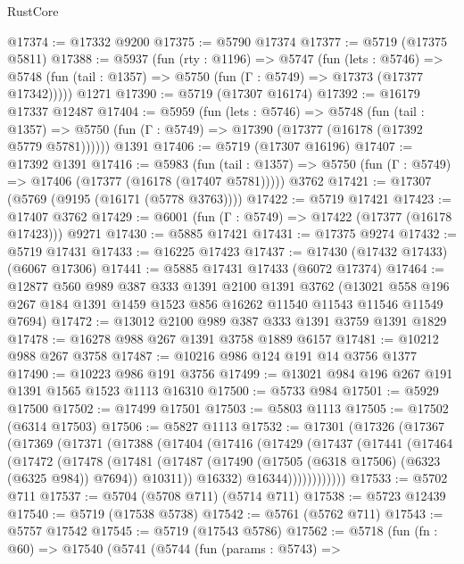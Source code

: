 \begin{lexlean}{RustCore}
\begin{coremodule}
@17374 := @17332 @9200
@17375 := @5790 @17374
@17377 := @5719 (@17375 @5811)
@17388 := @5937
    (fun (rty : @1196) =>
    @5747
      (fun (lets : @5746) =>
      @5748 (fun (tail : @1357) => @5750 (fun (Γ : @5749) => @17373 (@17377 @17342)))))
    @1271
@17390 := @5719 (@17307 @16174)
@17392 := @16179 @17337 @12487
@17404 := @5959
    (fun (lets : @5746) =>
    @5748
      (fun (tail : @1357) =>
      @5750 (fun (Γ : @5749) => @17390 (@17377 (@16178 (@17392 @5779 @5781))))))
    @1391
@17406 := @5719 (@17307 @16196)
@17407 := @17392 @1391
@17416 := @5983
    (fun (tail : @1357) => @5750 (fun (Γ : @5749) => @17406 (@17377 (@16178 (@17407 @5781)))))
    @3762
@17421 := @17307 (@5769 (@9195 (@16171 (@5778 @3763))))
@17422 := @5719 @17421
@17423 := @17407 @3762
@17429 := @6001 (fun (Γ : @5749) => @17422 (@17377 (@16178 @17423))) @9271
@17430 := @5885 @17421
@17431 := @17375 @9274
@17432 := @5719 @17431
@17433 := @16225 @17423
@17437 := @17430 (@17432 @17433) (@6067 @17306)
@17441 := @5885 @17431 @17433 (@6072 @17374)
@17464 := @12877
    @560
    @989
    @387
    @333
    @1391
    @2100
    @1391
    @3762
    (@13021 @558 @196 @267 @184 @1391 @1459 @1523 @856 @16262 @11540 @11543 @11546 @11549 @7694)
@17472 := @13012 @2100 @989 @387 @333 @1391 @3759 @1391 @1829
@17478 := @16278 @988 @267 @1391 @3758 @1889 @6157
@17481 := @10212 @988 @267 @3758
@17487 := @10216 @986 @124 @191 @14 @3756 @1377
@17490 := @10223 @986 @191 @3756
@17499 := @13021 @984 @196 @267 @191 @1391 @1565 @1523 @1113 @16310
@17500 := @5733 @984
@17501 := @5929 @17500
@17502 := @17499 @17501
@17503 := @5803 @1113
@17505 := @17502 (@6314 @17503)
@17506 := @5827 @1113
@17532 := @17301
    (@17326
      (@17367
        (@17369
          (@17371
            (@17388
              (@17404
                (@17416
                  (@17429
                    (@17437
                      (@17441
                        (@17464
                          (@17472
                            (@17478
                              (@17481
                                (@17487
                                  (@17490 (@17505 (@6318 @17506) (@6323 (@6325 @984)) @7694))
                                  @10311))
                              @16332)
                            @16344))))))))))))
@17533 := @5702 @711
@17537 := @5704 (@5708 @711) (@5714 @711)
@17538 := @5723 @12439
@17540 := @5719 (@17538 @5738)
@17542 := @5761 (@5762 @711)
@17543 := @5757 @17542
@17545 := @5719 (@17543 @5786)
@17562 := @5718
    (fun (fn : @60) =>
    @17540
      (@5741
        (@5744
          (fun (params : @5743) =>

\end{coremodule}
\end{lexlean}
